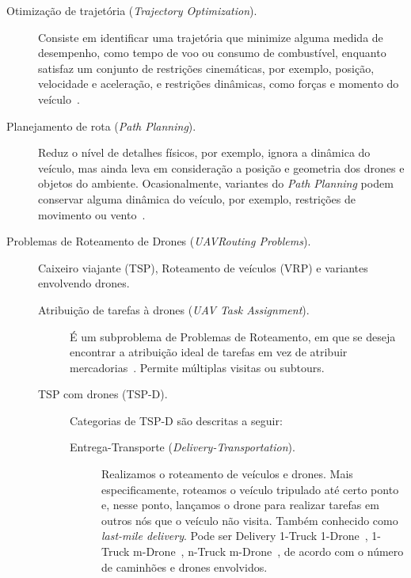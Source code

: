 \documentclass[12pt, a4paper]{article}
\begin{document}
\begin{description}
	\item [Otimização de trajetória (\textit{Trajectory Optimization}).] Consiste em identificar uma trajetória que minimize alguma medida de desempenho, como tempo de voo ou consumo de combustível, enquanto satisfaz um conjunto de restrições cinemáticas, por exemplo, posição, velocidade e aceleração, e restrições dinâmicas, como forças e momento do veículo~\cite{coutinho2018unmanned}.
	
	\item [Planejamento de rota (\textit{Path Planning}).] Reduz o nível de detalhes físicos, por exemplo, ignora a dinâmica do veículo, mas ainda leva em consideração a posição e geometria dos drones e objetos do ambiente\cite{radmanesh2018overview, sarath2018prototype}. Ocasionalmente, variantes do \textit{Path Planning} podem conservar alguma dinâmica do veículo, por exemplo, restrições de movimento ou vento~\cite{macharet2018survey, luo2018integrated}.
	
	\item [Problemas de Roteamento de Drones (\textit{UAV\footnotemark Routing Problems}).] Caixeiro viajante (TSP), Roteamento de veículos (VRP) e variantes envolvendo drones.
	\begin{description}
		\item [Atribuição de tarefas à drones (\textit{UAV Task Assignment}).] É um subproblema de Problemas de Roteamento, em que se deseja encontrar a atribuição ideal de tarefas em vez de atribuir mercadorias~\cite{jiang2017method}. Permite múltiplas visitas ou subtours.
		
		\item [TSP com drones (TSP-D).] Categorias de TSP-D são descritas a seguir:
		\begin{description}
			\item [Entrega-Transporte (\textit{Delivery-Transportation}).] Realizamos o roteamento de veículos e drones. Mais especificamente, roteamos o veículo tripulado até certo ponto e, nesse ponto, lançamos o drone para realizar tarefas em outros nós que o veículo não visita. Também conhecido como \textit{last-mile delivery}. Pode ser Delivery 1-Truck 1-Drone~\cite{agatz2018optimization}, 1-Truck m-Drone~\cite{tu2018traveling}, n-Truck m-Drone~\cite{kitjacharoenchai2019multiple}, de acordo com o número de caminhões e drones envolvidos.
			

\end{description}
\end{description}
\end{description}
\end{document}
